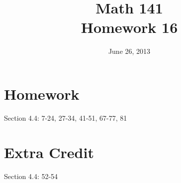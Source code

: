 \documentclass{exam}
\date{June 26, 2013}
\author{}
\title{Math 141 \\ Homework 16}
\begin{document}
    \maketitle

    \section{Homework}

    Section 4.4: 7-24, 27-34, 41-51, 67-77, 81

    \ifprintanswers
      \pagebreak
    \fi

    \section{Extra Credit}
    Section 4.4: 52-54

    \ifprintanswers
\end{document}
